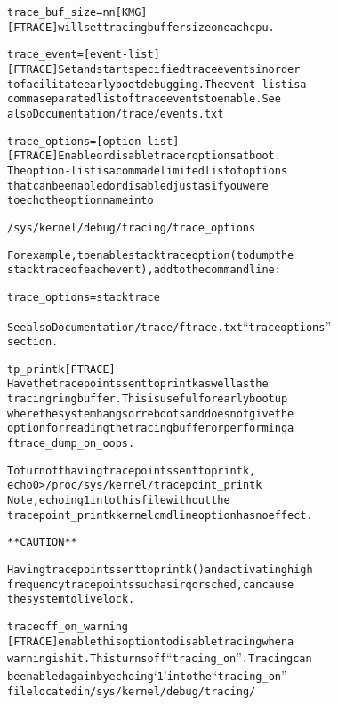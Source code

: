 \documentclass[a4paper,8pt,english]{sphinxmanual}
\begin{document}
\begin{alltt}
        trace\_buf\_size=nn{[}KMG{]}
                        {[}FTRACE{]} will set tracing buffer size on each cpu.

        trace\_event={[}event-list{]}
                        {[}FTRACE{]} Set and start specified trace events in order
                        to facilitate early boot debugging. The event-list is a
                        comma separated list of trace events to enable. See
                        also Documentation/trace/events.txt

        trace\_options={[}option-list{]}
                        {[}FTRACE{]} Enable or disable tracer options at boot.
                        The option-list is a comma delimited list of options
                        that can be enabled or disabled just as if you were
                        to echo the option name into

                            /sys/kernel/debug/tracing/trace\_options

                        For example, to enable stacktrace option (to dump the
                        stack trace of each event), add to the command line:

                              trace\_options=stacktrace

                        See also Documentation/trace/ftrace.txt ``trace options''
                        section.

        tp\_printk{[}FTRACE{]}
                        Have the tracepoints sent to printk as well as the
                        tracing ring buffer. This is useful for early boot up
                        where the system hangs or reboots and does not give the
                        option for reading the tracing buffer or performing a
                        ftrace\_dump\_on\_oops.

                        To turn off having tracepoints sent to printk,
                         echo 0 \textgreater{} /proc/sys/kernel/tracepoint\_printk
                        Note, echoing 1 into this file without the
                        tracepoint\_printk kernel cmdline option has no effect.

                        ** CAUTION **

                        Having tracepoints sent to printk() and activating high
                        frequency tracepoints such as irq or sched, can cause
                        the system to live lock.

        traceoff\_on\_warning
                        {[}FTRACE{]} enable this option to disable tracing when a
                        warning is hit. This turns off ``tracing\_on''. Tracing can
                        be enabled again by echoing `1' into the ``tracing\_on''
                        file located in /sys/kernel/debug/tracing/


\end{alltt}
\end{document}
